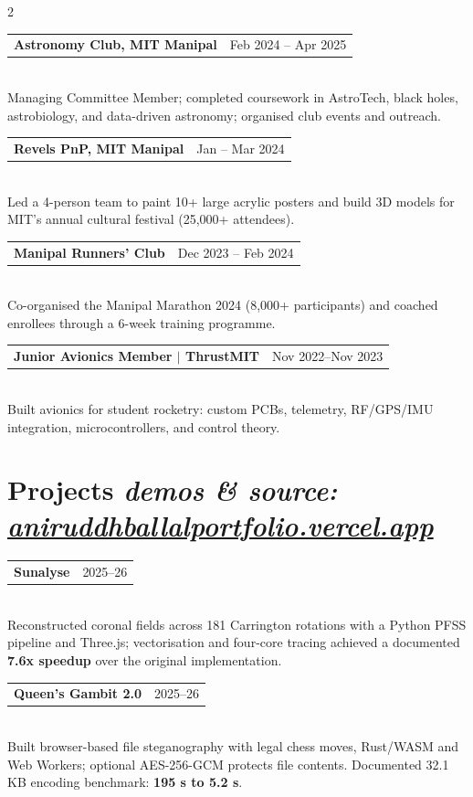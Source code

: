 \documentclass[letterpaper,10pt]{article}
\makeatletter
\newcommand{\entry}[2]{%
  \vspace{1pt}
  \begin{tabular*}{\linewidth}{@{}l@{\extracolsep{\fill}}r@{}}
    \small\textbf{#1} & \footnotesize #2
  \end{tabular*}\vspace{-4pt}
}
\newcommand{\proj}[3]{%
  \vspace{2pt}
  \begin{tabular*}{\linewidth}{@{}l@{\extracolsep{\fill}}r@{}}
    \small\textbf{#1}\hspace{4pt}{\scriptsize\textit{#2}} & \footnotesize #3
  \end{tabular*}\vspace{-4pt}
}
\makeatother
\begin{document}
\begin{paracol}{2}
\entry{Astronomy Club, MIT Manipal}{Feb 2024 -- Apr 2025}\\[4pt]
{\small Managing Committee Member; completed coursework in AstroTech, black holes, astrobiology, and data-driven astronomy; organised club events and outreach.}

\vspace{6pt}

\entry{Revels PnP, MIT Manipal}{Jan -- Mar 2024}\\[4pt]
{\small Led a 4-person team to paint 10+ large acrylic posters and build 3D models for MIT’s annual cultural festival (25,000+ attendees).}

\vspace{6pt}

\entry{Manipal Runners' Club}{Dec 2023 -- Feb 2024}\\[4pt]
{\small Co-organised the Manipal Marathon 2024 (8,000+ participants) and coached enrollees through a 6-week training programme.}

\vspace{6pt}

\entry{Junior Avionics Member $|$ ThrustMIT}{Nov 2022--Nov 2023}\\[4pt]
{\small Built avionics for student rocketry: custom PCBs, telemetry, RF/GPS/IMU integration, microcontrollers, and control theory.}

\section{Projects {\normalfont\scriptsize\textit{demos \& source: \href{https://aniruddhballalportfolio.vercel.app}{aniruddhballalportfolio.vercel.app}}}}

\proj{Sunalyse}{}{2025--26}\\[4pt]
{\small Reconstructed coronal fields across 181 Carrington rotations with a Python PFSS pipeline and Three.js; vectorisation and four-core tracing achieved a documented \textbf{7.6x speedup} over the original implementation.}

\vspace{4pt}

\proj{Queen's Gambit 2.0}{}{2025--26}\\[4pt]
{\small Built browser-based file steganography with legal chess moves, Rust/WASM and Web Workers; optional AES-256-GCM protects file contents. Documented 32.1 KB encoding benchmark: \textbf{195 s to 5.2 s}.}

\vspace{4pt}


\end{paracol}
\end{document}
